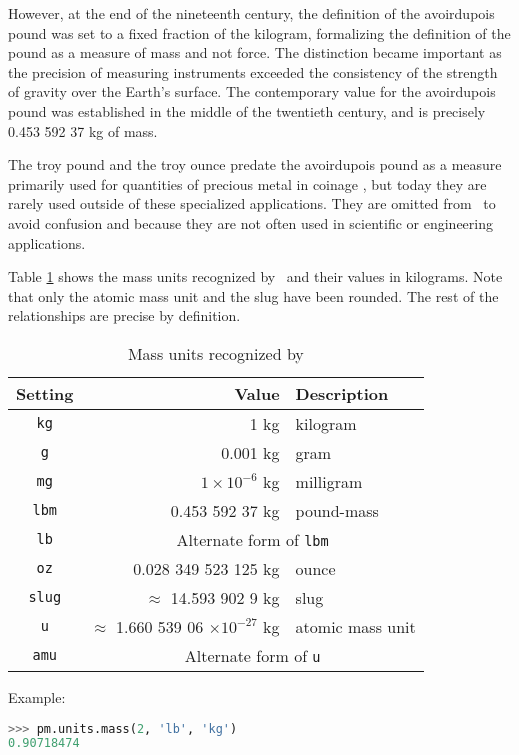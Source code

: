 However, at the end of the nineteenth century, the definition of the avoirdupois pound was set to a fixed fraction of the kilogram, formalizing the definition of the pound as a measure of mass and not force.  The distinction became important as the precision of measuring instruments exceeded the consistency of the strength of gravity over the Earth's surface.  The contemporary value for the avoirdupois pound was established in the middle of the twentieth century, and is precisely 0.453 592 37 kg of mass.\cite{nbs:59:1959}

The troy pound and the troy ounce predate the avoirdupois pound as a measure primarily used for quantities of precious metal in coinage \cite[p.6]{nbs:sp477}, but today they are rarely used outside of these specialized applications.  They are omitted from \PM\ to avoid confusion and because they are not often used in scientific or engineering applications.

Table \ref{tab:mass} shows the mass units recognized by \PM\ and their values in kilograms.  Note that only the atomic mass unit and the slug have been rounded.  The rest of the relationships are precise by definition.

\begin{table}
\centering
\caption{Mass units recognized by \PM}\label{tab:mass}
\begin{tabular}{crl}
\hline
Setting & Value & Description\\
\hline
\verb|kg| & 1 kg & kilogram\\
\verb|g| & 0.001 kg & gram\\
\verb|mg| & $1\times 10^{-6}$ kg & milligram\\
\verb|lbm| & 0.453 592 37 kg & pound-mass\\
\verb|lb| & \multicolumn{2}{c}{Alternate form of \texttt{lbm}}\\
\verb|oz| & 0.028 349 523 125 kg & ounce\\
\verb|slug| & $\approx$ 14.593 902 9 kg & slug\\
\verb|u| & $\approx$ 1.660 539 06 $\times 10^{-27}$ kg & atomic mass unit\\
\verb|amu| & \multicolumn{2}{c}{Alternate form of \texttt{u}}\\
\hline
\end{tabular}
\end{table}

Example:
\begin{lstlisting}[language=Python]
>>> pm.units.mass(2, 'lb', 'kg')
0.90718474
\end{lstlisting}


